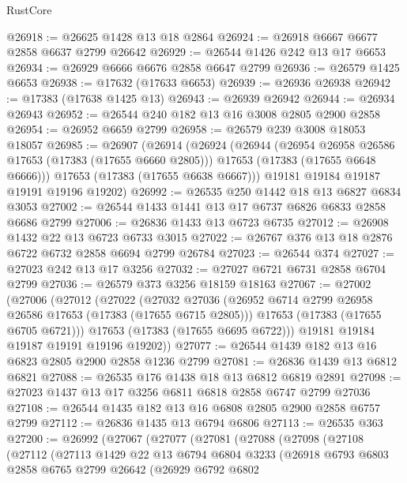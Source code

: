 \begin{lexlean}{RustCore}
\begin{coremodule}
@26918 := @26625 @1428 @13 @18 @2864
@26924 := @26918 @6667 @6677 @2858 @6637 @2799 @26642
@26929 := @26544 @1426 @242 @13 @17 @6653
@26934 := @26929 @6666 @6676 @2858 @6647 @2799
@26936 := @26579 @1425 @6653
@26938 := @17632 (@17633 @6653)
@26939 := @26936 @26938
@26942 := @17383 (@17638 @1425 @13)
@26943 := @26939 @26942
@26944 := @26934 @26943
@26952 := @26544 @240 @182 @13 @16 @3008 @2805 @2900 @2858
@26954 := @26952 @6659 @2799
@26958 := @26579 @239 @3008 @18053 @18057
@26985 := @26907
    (@26914
      (@26924
        (@26944
          (@26954 @26958 @26586 @17653 (@17383 (@17655 @6660 @2805)))
          @17653
          (@17383 (@17655 @6648 @6666)))
        @17653
        (@17383 (@17655 @6638 @6667)))
      @19181
      @19184
      @19187
      @19191
      @19196
      @19202)
@26992 := @26535 @250 @1442 @18 @13 @6827 @6834 @3053
@27002 := @26544 @1433 @1441 @13 @17 @6737 @6826 @6833 @2858 @6686 @2799
@27006 := @26836 @1433 @13 @6723 @6735
@27012 := @26908 @1432 @22 @13 @6723 @6733 @3015
@27022 := @26767 @376 @13 @18 @2876 @6722 @6732 @2858 @6694 @2799 @26784
@27023 := @26544 @374
@27027 := @27023 @242 @13 @17 @3256
@27032 := @27027 @6721 @6731 @2858 @6704 @2799
@27036 := @26579 @373 @3256 @18159 @18163
@27067 := @27002
    (@27006
      (@27012
        (@27022
          (@27032
            @27036
            (@26952 @6714 @2799 @26958 @26586 @17653 (@17383 (@17655 @6715 @2805)))
            @17653
            (@17383 (@17655 @6705 @6721)))
          @17653
          (@17383 (@17655 @6695 @6722)))
        @19181
        @19184
        @19187
        @19191
        @19196
        @19202))
@27077 := @26544 @1439 @182 @13 @16 @6823 @2805 @2900 @2858 @1236 @2799
@27081 := @26836 @1439 @13 @6812 @6821
@27088 := @26535 @176 @1438 @18 @13 @6812 @6819 @2891
@27098 := @27023 @1437 @13 @17 @3256 @6811 @6818 @2858 @6747 @2799 @27036
@27108 := @26544 @1435 @182 @13 @16 @6808 @2805 @2900 @2858 @6757 @2799
@27112 := @26836 @1435 @13 @6794 @6806
@27113 := @26535 @363
@27200 := @26992
    (@27067
      (@27077
        (@27081
          (@27088
            (@27098
              (@27108
                (@27112
                  (@27113
                    @1429
                    @22
                    @13
                    @6794
                    @6804
                    @3233
                    (@26918
                      @6793
                      @6803
                      @2858
                      @6765
                      @2799
                      @26642
                      (@26929
                        @6792
                        @6802

\end{coremodule}
\end{lexlean}
